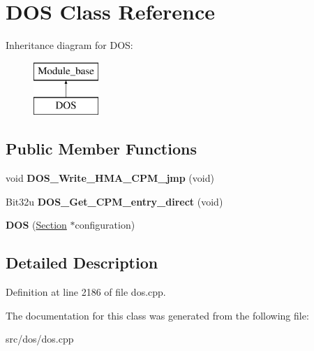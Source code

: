 \hypertarget{classDOS}{\section{D\-O\-S Class Reference}
\label{classDOS}
}
Inheritance diagram for D\-O\-S\-:\begin{figure}[H]
\begin{center}
\leavevmode
\includegraphics[height=2.000000cm]{classDOS}
\end{center}
\end{figure}
\subsection*{Public Member Functions}
\begin{DoxyCompactItemize}
\item 
\hypertarget{classDOS_a298dcab5e49ceecb15a2c1d9c4871866}{void {\bfseries D\-O\-S\-\_\-\-Write\-\_\-\-H\-M\-A\-\_\-\-C\-P\-M\-\_\-jmp} (void)}\label{classDOS_a298dcab5e49ceecb15a2c1d9c4871866}

\item 
\hypertarget{classDOS_aed995ebea1c96a560cecd4b2d9a6f90f}{Bit32u {\bfseries D\-O\-S\-\_\-\-Get\-\_\-\-C\-P\-M\-\_\-entry\-\_\-direct} (void)}\label{classDOS_aed995ebea1c96a560cecd4b2d9a6f90f}

\item 
\hypertarget{classDOS_ad9dde79e7c7a3940e8aec707edc6e4ac}{{\bfseries D\-O\-S} (\hyperlink{classSection}{Section} $\ast$configuration)}\label{classDOS_ad9dde79e7c7a3940e8aec707edc6e4ac}

\end{DoxyCompactItemize}


\subsection{Detailed Description}


Definition at line 2186 of file dos.\-cpp.



The documentation for this class was generated from the following file\-:\begin{DoxyCompactItemize}
\item 
src/dos/dos.\-cpp\end{DoxyCompactItemize}
